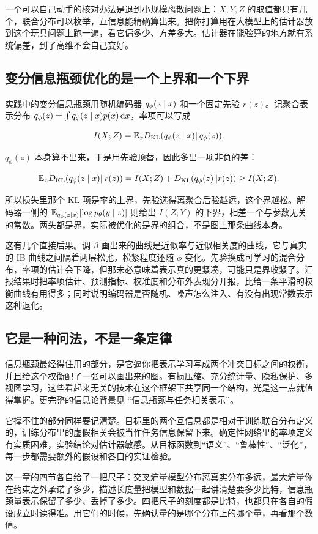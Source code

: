 一个可以自己动手的核对办法是退到小规模离散问题上：\(X,Y,Z\) 的取值都只有几个，联合分布可以枚举，互信息能精确算出来。把你打算用在大模型上的估计器放到这个玩具问题上跑一遍，看它偏多少、方差多大。估计器在能验算的地方就有系统偏差，到了高维不会自己变好。

\subsection{变分信息瓶颈优化的是一个上界和一个下界}

实践中的变分信息瓶颈用随机编码器 \(q_\phi(z\mid x)\) 和一个固定先验 \(r(z)\)。记聚合表示分布 \(q_\phi(z)=\int q_\phi(z\mid x)p(x)\,\mathrm dx\)，率项可以写成

\[
I(X;Z)=\mathbb{E}_xD_{\mathrm{KL}}(q_\phi(z\mid x)\|q_\phi(z)).
\]

\(q_\phi(z)\) 本身算不出来，于是用先验顶替，因此多出一项非负的差：

\[
\mathbb{E}_xD_{\mathrm{KL}}(q_\phi(z\mid x)\|r(z))=I(X;Z)+D_{\mathrm{KL}}(q_\phi(z)\|r(z))\ge I(X;Z).
\]

所以损失里那个 KL 项是率的上界，先验选得离聚合后验越远，这个界越松。解码器一侧的 \(\mathbb{E}_{q_\phi(z\mid x)}[\log p_\theta(y\mid z)]\) 则给出 \(I(Z;Y)\) 的下界，相差一个与参数无关的常数。两头都是界，实际被优化的是界的组合，不是图上那条曲线本身。

这有几个直接后果。调 \(\beta\) 画出来的曲线是近似率与近似相关度的曲线，它与真实的 IB 曲线之间隔着两层松弛，松紧程度还随 \(\phi\) 变化。先验换成可学习的混合分布，率项的估计会下降，但那未必意味着表示真的更紧凑，可能只是界收紧了。汇报结果时把率项估计、预测指标、校准度和分布外表现分开报，比给一条平滑的权衡曲线有用得多；同时说明编码器是否随机、噪声怎么注入、有没有出现常数表示这种退化。

\subsection{它是一种问法，不是一条定律}

信息瓶颈最经得住用的部分，是它逼你把表示学习写成两个冲突目标之间的权衡，并且给这个权衡配了一张可以画出来的图。有损压缩、充分统计量、隐私保护、多视图学习，这些看起来无关的技术在这个框架下共享同一个结构，光是这一点就值得掌握。更完整的信息论背景见 \hyperref[sec:07-Information-Theory/06-Information-and-Learning/03]{``信息瓶颈与任务相关表示''}。

它撑不住的部分同样要记清楚。目标里的两个互信息都是相对于训练联合分布定义的，训练分布里的虚假相关会被当作任务信息保留下来。确定性网络里的率项定义有实质困难，实验结论对估计器敏感。从目标函数到``语义''、``鲁棒性''、``泛化''，每一步都需要额外的假设和各自的实证检验。

这一章的四节各自给了一把尺子：交叉熵量模型分布离真实分布多远，最大熵量你在约束之外承诺了多少，描述长度量把模型和数据一起讲清楚要多少比特，信息瓶颈量表示保留了多少、丢掉了多少。四把尺子的刻度都是比特，也都只在各自的假设成立时读得准。用它们的时候，先确认量的是哪个分布上的哪个量，再看那个数值。
